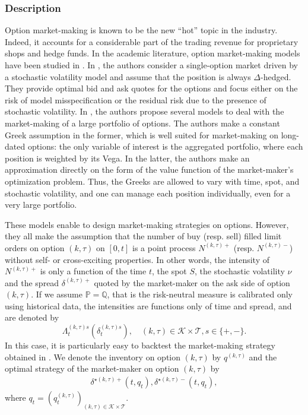 \documentclass[12pt]{article}
\begin{document}
\subsubsection{Description}
Option market-making is known to be the new ``hot'' topic in the industry. Indeed, it accounts for a considerable part of the trading revenue for proprietary shops and hedge funds. In the academic literature, option market-making models have been studied in \cite{baldacci2019algorithmic, baldacci2020approximate, el2015stochastic, stoikov2009option}. In \cite{el2015stochastic,stoikov2009option}, the authors consider a single-option market driven by a stochastic volatility model and assume that the position is always $\Delta$-hedged. They provide optimal bid and ask quotes for the options and focus either on the risk of model misspecification or the residual risk due to the presence of stochastic volatility. In \cite{baldacci2019algorithmic,baldacci2020approximate}, the authors propose several models to deal with the market-making of a large portfolio of options. The authors make a constant Greek assumption in the former, which is well suited for market-making on long-dated options: the only variable of interest is the aggregated portfolio, where each position is weighted by its Vega. In the latter, the authors make an approximation directly on the form of the value function of the market-maker's optimization problem. Thus, the Greeks are allowed to vary with time, spot, and stochastic volatility, and one can manage each position individually, even for a very large portfolio. \medskip

These models enable to design market-making strategies on options. However, they all make the assumption that the number of buy (resp. sell) filled limit orders on option $(k,\tau)$ on $[0,t]$ is a point process $N^{(k,\tau)+}$ (resp. $N^{(k,\tau)-}$) without self- or cross-exciting properties. In other words, the intensity of $N^{(k,\tau)+}$ is only a function of the time $t$, the spot $S$, the stochastic volatility $\nu$ and the spread $\delta^{(k,\tau)+}$ quoted by the market-maker on the ask side of option $(k,\tau)$. If we assume $\mathbb{P}=\mathbb{Q}$, that is the risk-neutral measure is calibrated only using historical data, the intensities are functions only of time and spread, and are denoted by \[\Lambda^{(k,\tau)s}_t(\delta_t^{(k,\tau)s}), \quad (k,\tau)\in \mathcal{K}\times\mathcal{T}, s\in \{+,-\}.\]
In this case, it is particularly easy to backtest the market-making strategy obtained in \cite{baldacci2019algorithmic,baldacci2020approximate}. We denote the inventory on option $(k,\tau)$ by $q^{(k,\tau)}$ and the optimal strategy of the market-maker on option $(k,\tau)$ by 
\begin{align}\label{optimal_trading_MM}
\delta^{\star (k,\tau)+}(t,q_t),\delta^{\star (k,\tau)-}(t,q_t),
\end{align}
where $q_t=(q_t^{(k,\tau)})_{(k,\tau)\in\mathcal{K}\times\mathcal{T}}$.\medskip
\end{document}
